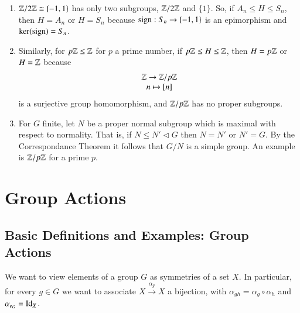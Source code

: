 \documentclass[12pt, a4paper, oneside, openright, titlepage]{book}
\begin{document}
\begin{eg}
        \leavevmode
        \begin{enumerate}
                \item $\mathbb Z/2\mathbb Z \cong \{-1,1\}$ has only two subgroups, $\mathbb Z/2\mathbb Z$ and $\{1\}$. So, if $A_n \leq H \leq S_n$, then $H = A_n$ or $H = S_n$ because $\operatorname{sign}:S_n\rightarrow \{-1,1\}$ is an epimorphism and $\ker(\operatorname{sign}) = S_n$.
                \item Similarly, for $p\mathbb Z\leq \mathbb Z$ for $p$ a prime number, if $p\mathbb Z \leq H \leq \mathbb Z$, then $H = p\mathbb Z$ or $H = \mathbb Z$ because \begin{equation}
                                \begin{array}{c} \mathbb Z\rightarrow \mathbb Z/p\mathbb Z \\ n\mapsto {[n]} \end{array}
                \end{equation}
                        is a surjective group homomorphism, and $\mathbb Z/p\mathbb Z$ has no proper subgroups.
                \item For $G$ finite, let $N$ be a proper normal subgroup which is maximal with respect to normality. That is, if $N \leq N' \vartriangleleft G$ then $N = N'$ or $N' = G$. By the Correspondance Theorem it follows that $G/N$ is a simple group. An example is $\mathbb Z/p\mathbb Z$ for a prime $p$.
        \end{enumerate}
\end{eg}




\chapter{\textsection\textsection Group Actions}

\section{\textsection Basic Definitions and Examples: Group Actions}

\begin{rmk}[Motivation]
        We want to view elements of a group $G$ as symmetries of a set $X$. In particular, for every $g \in G$ we want to associate $X \xrightarrow{\alpha_g} X$ a bijection, with $\alpha_{gh} = \alpha_g \circ \alpha_h$ and $\alpha_{e_G} = \operatorname{Id}_X$.
\end{rmk}
\end{document}
